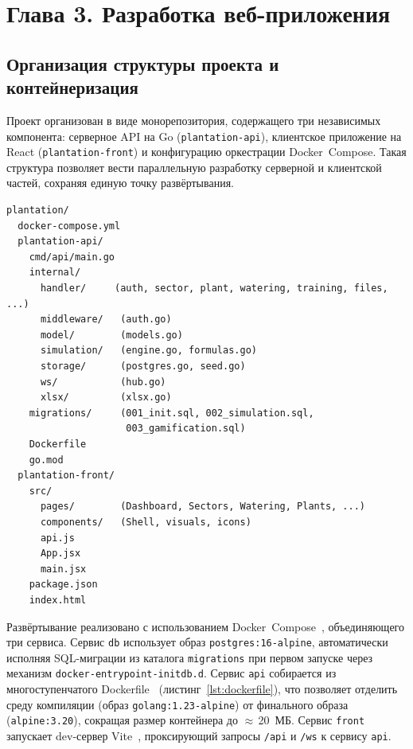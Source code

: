 \section*{Глава 3. Разработка веб-приложения}


\subsection{Организация структуры проекта и контейнеризация}

Проект организован в виде монорепозитория, содержащего три
независимых компонента: серверное API на Go (\texttt{plantation-api}),
клиентское приложение на React (\texttt{plantation-front}) и
конфигурацию оркестрации Docker~Compose. Такая структура
позволяет вести параллельную разработку серверной и клиентской
частей, сохраняя единую точку развёртывания.

\begin{lstlisting}[caption={Файловая структура проекта}, label={lst:project_tree}]
plantation/
  docker-compose.yml
  plantation-api/
    cmd/api/main.go
    internal/
      handler/     (auth, sector, plant, watering, training, files, ...)
      middleware/   (auth.go)
      model/        (models.go)
      simulation/   (engine.go, formulas.go)
      storage/      (postgres.go, seed.go)
      ws/           (hub.go)
      xlsx/         (xlsx.go)
    migrations/     (001_init.sql, 002_simulation.sql,
                     003_gamification.sql)
    Dockerfile
    go.mod
  plantation-front/
    src/
      pages/        (Dashboard, Sectors, Watering, Plants, ...)
      components/   (Shell, visuals, icons)
      api.js
      App.jsx
      main.jsx
    package.json
    index.html
\end{lstlisting}

Развёртывание реализовано с использованием
Docker~Compose~\cite{docker_compose_docs,docker_compose_file_reference},
объединяющего три сервиса. Сервис \texttt{db} использует образ
\texttt{postgres:16-alpine}, автоматически исполняя SQL-миграции
из каталога \texttt{migrations} при первом запуске через
механизм \texttt{docker-entrypoint-initdb.d}.
Сервис \texttt{api} собирается из многоступенчатого
Dockerfile~\cite{docker_multistage_docs} (листинг~\ref{lst:dockerfile}),
что позволяет отделить среду компиляции (образ \texttt{golang:1.23-alpine})
от финального образа (\texttt{alpine:3.20}), сокращая размер
контейнера до $\approx$\,20~МБ. Сервис \texttt{front}
запускает dev-сервер Vite~\cite{vite_official}, проксирующий
запросы \texttt{/api} и \texttt{/ws} к сервису \texttt{api}.

